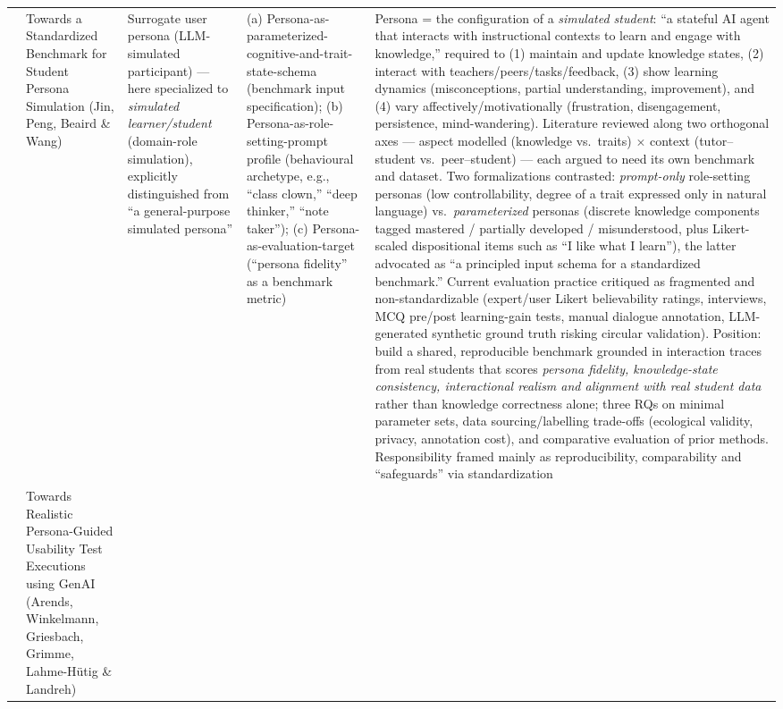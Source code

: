 \begin{table}[t]
\begin{tabular}{p{0.5cm} p{3.6cm} p{3.4cm} p{3.6cm} p{3.6cm}}
\addlinespace
12 & Towards a Standardized Benchmark for Student Persona Simulation (Jin, Peng, Beaird \& Wang) &
Surrogate user persona (LLM-simulated participant) --- here specialized to \emph{simulated learner/student} (domain-role simulation), explicitly distinguished from ``a general-purpose simulated persona'' &
(a) Persona-as-parameterized-cognitive-and-trait-state-schema (benchmark input specification); (b) Persona-as-role-setting-prompt profile (behavioural archetype, e.g., ``class clown,'' ``deep thinker,'' ``note taker''); (c) Persona-as-evaluation-target (``persona fidelity'' as a benchmark metric) &
Persona = the configuration of a \emph{simulated student}: ``a stateful AI agent that interacts with instructional contexts to learn and engage with knowledge,'' required to (1) maintain and update knowledge states, (2) interact with teachers/peers/tasks/feedback, (3) show learning dynamics (misconceptions, partial understanding, improvement), and (4) vary affectively/motivationally (frustration, disengagement, persistence, mind-wandering). Literature reviewed along two orthogonal axes --- aspect modelled (knowledge vs.\ traits) $\times$ context (tutor--student vs.\ peer--student) --- each argued to need its own benchmark and dataset. Two formalizations contrasted: \emph{prompt-only} role-setting personas (low controllability, degree of a trait expressed only in natural language) vs.\ \emph{parameterized} personas (discrete knowledge components tagged mastered / partially developed / misunderstood, plus Likert-scaled dispositional items such as ``I like what I learn''), the latter advocated as ``a principled input schema for a standardized benchmark.'' Current evaluation practice critiqued as fragmented and non-standardizable (expert/user Likert believability ratings, interviews, MCQ pre/post learning-gain tests, manual dialogue annotation, LLM-generated synthetic ground truth risking circular validation). Position: build a shared, reproducible benchmark grounded in interaction traces from real students that scores \emph{persona fidelity, knowledge-state consistency, interactional realism and alignment with real student data} rather than knowledge correctness alone; three RQs on minimal parameter sets, data sourcing/labelling trade-offs (ecological validity, privacy, annotation cost), and comparative evaluation of prior methods. Responsibility framed mainly as reproducibility, comparability and ``safeguards'' via standardization \\
\addlinespace
13 & Towards Realistic Persona-Guided Usability Test Executions using GenAI (Arends, Winkelmann, Griesbach, Grimme, Lahme-Hütig \& Landreh) &

\end{tabular}
\end{table}

